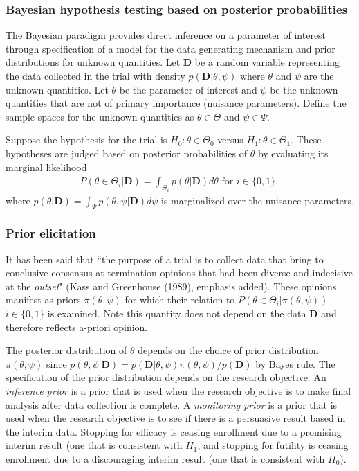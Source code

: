 \documentclass[12pt]{article}
\begin{document}
\subsubsection{Bayesian hypothesis testing based on posterior probabilities}

The Bayesian paradigm provides direct inference on a parameter of interest through specification of a model for the data generating mechanism and prior distributions for unknown quantities. Let $\mathbf{D}$ be a random variable representing the data collected in the trial with density $p(\mathbf{D}|\theta,\psi)$ where $\theta$ and $\psi$ are the unknown quantities. Let $\theta$ be the parameter of interest and $\psi$ be the unknown quantities that are not of primary importance (nuisance parameters). Define the sample spaces for the unknown quantities as $\theta\in\Theta$ and $\psi\in\Psi$. 

Suppose the hypothesis for the trial is $H_0:\theta\in\Theta_0$ versus $H_1:\theta\in\Theta_1$. These hypotheses are judged based on posterior probabilities of $\theta$ by evaluating its marginal likelihood 
\begin{align*}
P(\theta\in\Theta_i|\mathbf{D})=\int_{\Theta_i}p(\theta|\mathbf{D})d\theta\text{ for }i\in\{0,1\},
\end{align*}
where $p(\theta|\mathbf{D})=\int_{\Psi}p(\theta,\psi|\mathbf{D})d\psi$ is marginalized over the nuisance parameters.

\subsubsection{Prior elicitation}
It has been said that ``the purpose of a trial is to collect data that bring to conclusive consensus at termination opinions that had been diverse and indecisive at the \textit{outset}" (Kass and Greenhouse (1989), emphasis added). These opinions manifest as priors $\pi(\theta,\psi)$ for which their relation to $P(\theta\in\Theta_i|\pi(\theta,\psi))$ $i\in\{0,1\}$ is examined. Note this quantity does not depend on the data $\mathbf{D}$ and therefore reflects a-priori opinion.

The posterior distribution of $\theta$ depends on the choice of prior distribution $\pi(\theta,\psi)$ since $p(\theta,\psi|\mathbf{D})=p(\mathbf{D}|\theta,\psi)\pi(\theta,\psi)/p(\mathbf{D})$ by Bayes rule. The specification of the prior distribution depends on the research objective. An \textit{inference prior} is a prior that is used when the research objective is to make final analysis after data collection is complete. A \textit{monitoring prior} is a prior that is used when the research objective is to see if there is a persuasive result based in the interim data. Stopping for efficacy is ceasing enrollment due to a promising interim result (one that is consistent with $H_1$, and stopping for futility is ceasing enrollment due to a discouraging interim result (one that is consistent with $H_0$).
\end{document}
